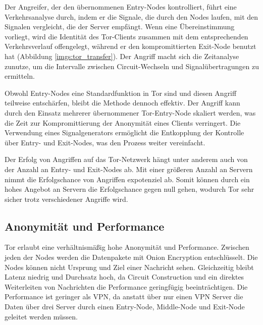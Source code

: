 Der Angreifer, der den übernommenen Entry-Nodes kontrolliert, führt eine Verkehrsanalyse durch, indem er die Signale, die durch den Nodes laufen, mit den Signalen vergleicht, die der Server empfängt. Wenn eine Übereinstimmung vorliegt, wird die Identität des Tor-Clients zusammen mit dem entsprechenden Verkehrsverlauf offengelegt, während er den kompromittierten Exit-Node benutzt hat (Abbildung \ref{imgs:tor_transfer}). Der Angriff macht sich die Zeitanalyse zunutze, um die Intervalle zwischen Circuit-Wechseln und Signalübertragungen zu ermitteln.

Obwohl Entry-Nodes eine Standardfunktion in Tor sind und diesen Angriff teilweise entschärfen, bleibt die Methode dennoch effektiv. Der Angriff kann durch den Einsatz mehrerer übernommener Tor-Entry-Node skaliert werden, was die Zeit zur Kompromittierung der Anonymität eines Clients verringert. Die Verwendung eines Signalgenerators ermöglicht die Entkopplung der Kontrolle über Entry- und Exit-Nodes, was den Prozess weiter vereinfacht\cite{BrowserBasedAttacksOnTor}.

Der Erfolg von Angriffen auf das Tor-Netzwerk hängt unter anderem auch von der Anzahl an Entry- und Exit-Nodes ab. Mit einer größeren Anzahl an Servern nimmt die Erfolgschance von Angriffen expotenziel ab. Somit können durch ein hohes Angebot an Servern die Erfolgschance gegen null gehen, wodurch Tor sehr sicher trotz verschiedener Angriffe wird.

\subsection{Anonymität und Performance}
\label{chap:tor_anonymity_performance}

Tor erlaubt eine verhältnismäßig hohe Anonymität und Performance. Zwischen jeden der Nodes werden die Datenpakete mit Onion Encryption entschlüsselt. Die Nodes können nicht Ursprung und Ziel einer Nachricht sehen. Gleichzeitig bleibt Latenz niedrig und Durchsatz hoch, da Circuit Construction und ein direktes Weiterleiten von Nachrichten die Performance geringfügig beeinträchtigen. Die Performance ist geringer als VPN, da anstatt über nur einen VPN Server die Daten über drei Server durch einen Entry-Node, Middle-Node und Exit-Node geleitet werden müssen\cite{PerformanceAndSecurityTor}.
